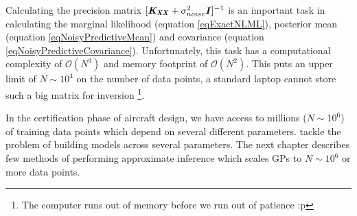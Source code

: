 Calculating the precision matrix $[\bm{\mathit{K_{XX}}}+ \sigma_{noise}^{2}\bm{\mathit{I}}]^{-1}$ is an important task in calculating the marginal likelihood (equation \ref{eqExactNLML}), posterior mean (equation \ref{eqNoisyPredictiveMean}) and covariance (equation \ref{eqNoisyPredictiveCovariance}). Unfortunately, this task has a computational complexity of $\mathcal{O}\left ( N^{3} \right )$ and memory footprint of $\mathcal{O}\left ( N^{2} \right )$. This puts an upper limit of $N \sim 10^4$ on the number of data points, a standard laptop cannot store such a big matrix for inversion \footnote{The computer runs out of memory before we run out of patience :p}. 

In the certification phase of aircraft design, we have access to millions ($N \sim 10^6$) of training data points which depend on several different parameters. \cite{bouhlel2016improved} tackle the problem of building models across several parameters. The next chapter describes few methods of performing approximate inference which scales GPs to $N \sim 10^6$ or more data points. 

